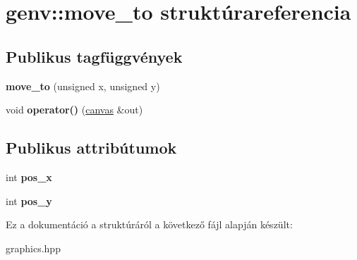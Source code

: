 \hypertarget{structgenv_1_1move__to}{}\section{genv\+:\+:move\+\_\+to struktúrareferencia}
\label{structgenv_1_1move__to}
\subsection*{Publikus tagfüggvények}
\begin{DoxyCompactItemize}
\item 
\mbox{\label{structgenv_1_1move__to_a96daf75da25a8eeb6df3110bdce481a2}} 
{\bfseries move\+\_\+to} (unsigned x, unsigned y)
\item 
\mbox{\label{structgenv_1_1move__to_a3321ab8a21292730ad46f62d29ef394f}} 
void {\bfseries operator()} (\hyperlink{classgenv_1_1canvas}{canvas} \&out)
\end{DoxyCompactItemize}
\subsection*{Publikus attribútumok}
\begin{DoxyCompactItemize}
\item 
\mbox{\label{structgenv_1_1move__to_acbe6ef0d2eb7a6f27d6028380ab40593}} 
int {\bfseries pos\+\_\+x}
\item 
\mbox{\label{structgenv_1_1move__to_a56bd951bc4a32057eb0e3670d571a0ab}} 
int {\bfseries pos\+\_\+y}
\end{DoxyCompactItemize}


Ez a dokumentáció a struktúráról a következő fájl alapján készült\+:\begin{DoxyCompactItemize}
\item 
graphics.\+hpp\end{DoxyCompactItemize}
